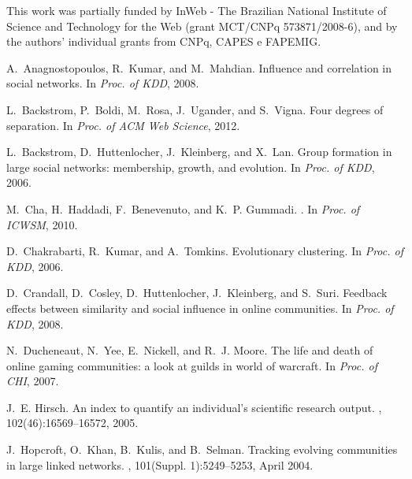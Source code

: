 \documentclass[letterpaper]{www13-companion-accepted}
\begin{document}
This work was partially funded by InWeb - The Brazilian National Institute
of Science and Technology for the Web (grant MCT/CNPq 573871/2008-6), and
by the authors' individual grants from CNPq, CAPES e FAPEMIG.


{

\begin{thebibliography}{10}

A.~Anagnostopoulos, R.~Kumar, and M.~Mahdian.
\newblock Influence and correlation in social networks.
\newblock In {\em Proc. of KDD}, 2008.

L.~Backstrom, P.~Boldi, M.~Rosa, J.~Ugander, and S.~Vigna.
\newblock Four degrees of separation.
\newblock In {\em Proc. of ACM Web Science}, 2012.

L.~Backstrom, D.~Huttenlocher, J.~Kleinberg, and X.~Lan.
\newblock Group formation in large social networks: membership, growth, and
  evolution.
\newblock In {\em Proc. of KDD}, 2006.

M.~Cha, H.~Haddadi, F.~Benevenuto, and K.~P. Gummadi.
.
\newblock In {\em Proc. of ICWSM}, 2010.

D.~Chakrabarti, R.~Kumar, and A.~Tomkins.
\newblock Evolutionary clustering.
\newblock In {\em Proc. of KDD}, 2006.

D.~Crandall, D.~Cosley, D.~Huttenlocher, J.~Kleinberg, and S.~Suri.
\newblock Feedback effects between similarity and social influence in online
  communities.
\newblock In {\em Proc. of KDD}, 2008.

N.~Ducheneaut, N.~Yee, E.~Nickell, and R.~J. Moore.
\newblock The life and death of online gaming communities: a look at guilds in
  world of warcraft.
\newblock In {\em Proc. of CHI}, 2007.

J.~E. Hirsch.
\newblock An index to quantify an individual's scientific research output.
,
  102(46):16569--16572, 2005.

J.~Hopcroft, O.~Khan, B.~Kulis, and B.~Selman.
\newblock Tracking evolving communities in large linked networks.
, 101(Suppl.
  1):5249--5253, April 2004.


\end{thebibliography}}
\end{document}
